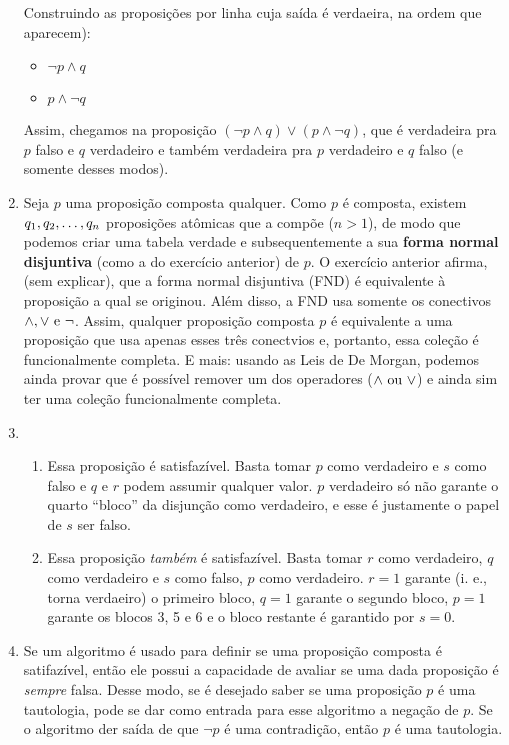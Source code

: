 \documentclass[12pt]{article}
\begin{document}
\begin{enumerate}
        Construindo as proposições por linha cuja saída é verdaeira, na ordem que aparecem):

        \begin{itemize}
            \item \( \neg p \land q\) 
            \item \( p \land \neg q \) 
        \end{itemize}

        Assim, chegamos na proposição \( (\neg p \land q) \lor (p \land \neg q) \), que é verdadeira pra \( p \) falso e \( q \) verdadeiro e também verdadeira pra \( p \) verdadeiro e \( q \) falso (e somente desses modos).

    \item Seja \( p \) uma proposição composta qualquer. Como \( p \) é composta, existem \( q_1, q_2, \mathellipsis,q_n \) proposições atômicas que a compõe (\( n > 1\)), de modo que podemos criar uma tabela verdade e subsequentemente a sua \textbf{forma normal disjuntiva} (como a do exercício anterior) de \( p \). O exercício anterior afirma, (sem explicar), que a forma normal disjuntiva (FND) é equivalente à proposição a qual se originou. Além disso, a FND usa somente os conectivos \( \land, \lor \textnormal{ e } \neg \). Assim, qualquer proposição composta \( p \) é equivalente a uma proposição que usa apenas esses três conectvios e, portanto, essa coleção é funcionalmente completa. E mais: usando as Leis de De Morgan, podemos ainda provar que é possível remover um dos operadores (\( \land \textnormal{ ou } \lor \)) e ainda sim ter uma coleção funcionalmente completa.

    \item 
        \begin{enumerate}
            \item Essa proposição é satisfazível. Basta tomar \( p \) como verdadeiro e \( s \) como falso e \( q \) e \( r \) podem assumir qualquer valor. \( p \) verdadeiro só não garante o quarto ``bloco'' da disjunção como verdadeiro, e esse é justamente o papel de \( s \) ser falso.

            \item Essa proposição \textit{também} é satisfazível. Basta tomar \( r \) como verdadeiro, \( q \) como verdadeiro e \( s \) como falso, \( p \) como verdadeiro. \( r = 1 \) garante (i. e., torna verdaeiro) o primeiro bloco, \( q = 1 \) garante o segundo bloco, \( p = 1 \) garante os blocos 3, 5 e 6 e o bloco restante é garantido por \( s = 0 \).
        \end{enumerate}

    \item Se um algoritmo é usado para definir se uma proposição composta é satifazível, então ele possui a capacidade de avaliar se uma dada proposição é \textit{sempre} falsa. Desse modo, se é desejado saber se uma proposição \( p \) é uma tautologia, pode se dar como entrada para esse algoritmo a negação de \( p\). Se o algoritmo der saída de que \( \neg p \) é uma contradição, então \( p \) é uma tautologia.

\end{enumerate}
\end{document}
